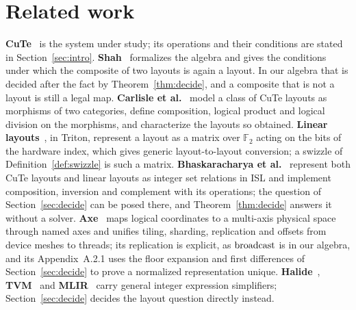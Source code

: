 \section{Related work}\label{sec:related}

\textbf{CuTe}~\cite{cutedocs,cecka} is the system under study; its operations
and their conditions are stated in Section~\ref{sec:intro}.
\textbf{Shah}~\cite{shah} formalizes the algebra and gives the conditions
under which the composite of two layouts is again a layout. In our algebra
that is decided after the fact by Theorem~\ref{thm:decide}, and a composite
that is not a layout is still a legal map. \textbf{Carlisle et
al.}~\cite{categorical} model a class of CuTe layouts as morphisms of two
categories, define composition, logical product and logical division on the
morphisms, and characterize the layouts so obtained. \textbf{Linear
layouts}~\cite{triton}, in Triton, represent a layout as a matrix over
$\mathbb{F}_2$ acting on the bits of the hardware index, which gives generic
layout-to-layout conversion; a swizzle of Definition~\ref{def:swizzle} is such
a matrix. \textbf{Bhaskaracharya et al.}~\cite{isl} represent both CuTe
layouts and linear layouts as integer set relations in ISL and implement
composition, inversion and complement with its operations; the question of
Section~\ref{sec:decide} can be posed there, and Theorem~\ref{thm:decide}
answers it without a solver. \textbf{Axe}~\cite{axe} maps logical
coordinates to a multi-axis physical space through named axes and unifies
tiling, sharding, replication and offsets from device meshes to threads; its
replication is explicit, as $\mathrm{broadcast}$ is in our algebra, and its
Appendix~A.2.1 uses the floor expansion and first differences of
Section~\ref{sec:decide} to prove a normalized representation unique.
\textbf{Halide}~\cite{halide}, \textbf{TVM}~\cite{tvm} and
\textbf{MLIR}~\cite{mlir} carry general integer expression simplifiers;
Section~\ref{sec:decide} decides the layout question directly instead.
